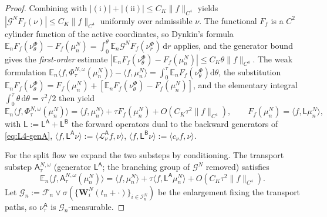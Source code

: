 \documentclass[a4paper,fleqn]{cas-sc}
\theoremstyle{definition}
\theoremstyle{remark}
\begin{document}
\begin{proof}
Combining with $|(\mathrm i)|+|(\mathrm{ii})|\le C_K\|f\|_{C^4}$ yields
$|\mathcal G^NF_f(\nu)|\le C_K\|f\|_{C^4}$ uniformly over admissible $\nu$. The functional $F_f$ is a
$C^2$ cylinder function of the active coordinates, so Dynkin's formula
$\mathbb E_nF_f(\nu^\Phi_\theta)-F_f(\mu^N_n)=\int_0^\theta\mathbb E_n\mathcal G^NF_f(\nu^\Phi_r)\,\mathrm dr$
applies, and the generator bound gives the \emph{first-order} estimate
$|\mathbb E_nF_f(\nu^\Phi_\theta)-F_f(\mu^N_n)|\le C_K\theta\|f\|_{C^4}$. The weak
formulation $\mathbb E_n\langle f,\Phi^{N,\omega}_\tau(\mu^N_n)\rangle-\langle f,\mu^N_n\rangle
=\int_0^\tau\mathbb E_nF_f(\nu^\Phi_\theta)\mathrm d\theta$, the substitution
$\mathbb E_nF_f(\nu^\Phi_\theta)=F_f(\mu^N_n)+[\mathbb E_nF_f(\nu^\Phi_\theta)-F_f(\mu^N_n)]$, and the
elementary integral $\int_0^\tau\theta\,\mathrm d\theta=\tau^2/2$ then yield
\begin{equation}\label{eq:Phi-exp}
\mathbb E_n\langle f,\Phi^{N,\omega}_\tau(\mu^N_n)\rangle
=\langle f,\mu^N_n\rangle+\tau F_f(\mu^N_n)+O(C_K\tau^2\|f\|_{C^4}),
\qquad F_f(\mu^N_n)=\langle f,\mathsf L\mu^N_n\rangle,
\end{equation}
with $\mathsf L:=\mathsf L^{\mathsf A}+\mathsf L^{\mathsf B}$ the forward operators dual to the
backward generators of \eqref{eq:L4-genA},
$\langle f,\mathsf L^{\mathsf A}\nu\rangle:=\langle \mathcal L^{\mathsf A}_\nu f,\nu\rangle$,
$\langle f,\mathsf L^{\mathsf B}\nu\rangle:=\langle c_\nu f,\nu\rangle$.

For the split flow we expand the two substeps by conditioning. The transport substep
$\mathsf A^{N,\omega}_\tau$ (generator $\mathsf L^{\mathsf A}$; the branching group of
$\mathcal G^N$ removed) satisfies
\begin{equation}\label{eq:A-exp}
\mathbb E_n\langle f,\mathsf A^{N,\omega}_\tau(\mu^N_n)\rangle
=\langle f,\mu^N_n\rangle+\tau\langle f,\mathsf L^{\mathsf A}\mu^N_n\rangle+O(C_K\tau^2\|f\|_{C^4}).
\end{equation}
Let $\mathcal G_n:=\mathcal F_n\vee\sigma(\{\mathbf W^N_i(t_n+\cdot)\}_{i\in\mathcal I^N_n})$ be
the enlargement fixing the transport paths, so $\nu^{\mathsf A}_\tau$ is
$\mathcal G_n$-measurable.


\end{proof}
\end{document}
